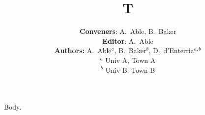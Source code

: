 \documentclass{article}
\begin{document}
\title{T}
\author{{\bf Conveners}: A.~Able, B.~Baker\\
{\bf Editor}: A.~Able\\
{\bf Authors:} A.~Able$^a$, B.~Baker$^b$, D.~d'Enterria$^{a,b}$\\
$^a$ Univ A, Town A\\
$^b$ Univ B, Town B}
\maketitle
Body.
\end{document}
